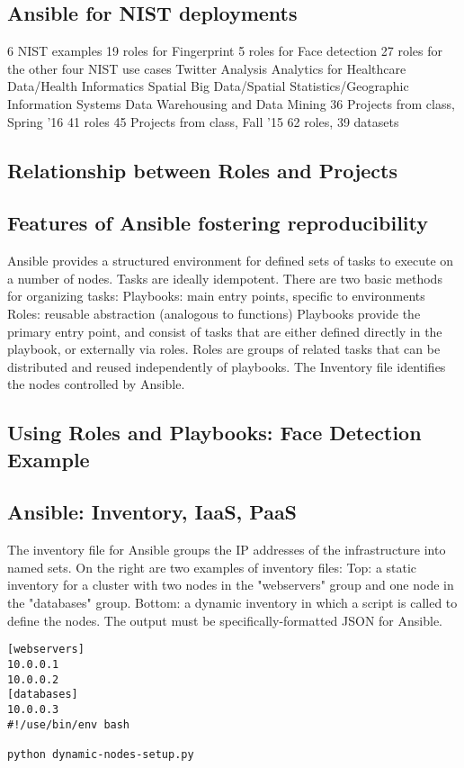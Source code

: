 \subsection{Ansible for NIST deployments}
6 NIST examples
19 roles for Fingerprint 
5 roles for Face detection 
27 roles for the other four NIST use cases
Twitter Analysis
Analytics for Healthcare Data/Health Informatics
Spatial Big Data/Spatial Statistics/Geographic Information Systems
Data Warehousing and Data Mining
36 Projects from class, Spring '16 
41 roles
45 Projects from class, Fall '15
62 roles, 39 datasets

\subsection{Relationship between Roles and Projects}
\subsection{Features of Ansible fostering reproducibility}
Ansible provides a structured environment for defined sets of tasks to execute on a number of nodes. Tasks are ideally idempotent.
There are two basic methods for organizing tasks:
Playbooks: main entry points, specific to environments
Roles: reusable abstraction (analogous to functions)
Playbooks provide the primary entry point, and consist of tasks that are either defined directly in the playbook, or externally via roles.
Roles are groups of related tasks that can be distributed and reused independently of playbooks.
The Inventory file identifies the nodes controlled by Ansible.
\subsection{Using Roles and Playbooks: Face Detection Example }


\subsection{Ansible: Inventory, IaaS, PaaS}
The inventory file for Ansible groups the IP addresses of the infrastructure into named sets.
On the right are two examples of inventory files:
Top: a static inventory for a cluster with two nodes in the "webservers" group and one node in the "databases" group.
Bottom: a dynamic inventory in which a script is called to define the nodes. The output must be specifically-formatted JSON for Ansible.
\begin{Verbatim}
[webservers]
10.0.0.1
10.0.0.2
[databases]
10.0.0.3
#!/use/bin/env bash

python dynamic-nodes-setup.py
\end{Verbatim}

